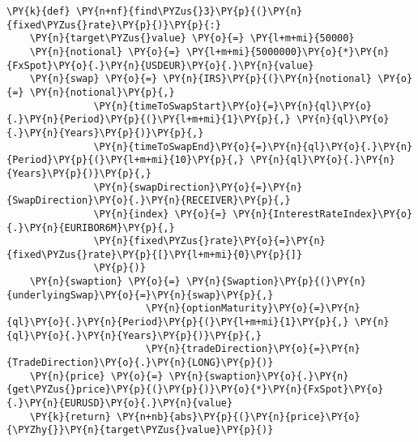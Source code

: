 \begin{tcolorbox}[breakable, size=fbox, boxrule=1pt, pad at break*=1mm,colback=cellbackground, colframe=cellborder]
\begin{Verbatim}[commandchars=\\\{\}]
\PY{k}{def} \PY{n+nf}{find\PYZus{}3}\PY{p}{(}\PY{n}{fixed\PYZus{}rate}\PY{p}{)}\PY{p}{:}
    \PY{n}{target\PYZus{}value} \PY{o}{=} \PY{l+m+mi}{50000}
    \PY{n}{notional} \PY{o}{=} \PY{l+m+mi}{5000000}\PY{o}{*}\PY{n}{FxSpot}\PY{o}{.}\PY{n}{USDEUR}\PY{o}{.}\PY{n}{value}
    \PY{n}{swap} \PY{o}{=} \PY{n}{IRS}\PY{p}{(}\PY{n}{notional} \PY{o}{=} \PY{n}{notional}\PY{p}{,}
               \PY{n}{timeToSwapStart}\PY{o}{=}\PY{n}{ql}\PY{o}{.}\PY{n}{Period}\PY{p}{(}\PY{l+m+mi}{1}\PY{p}{,} \PY{n}{ql}\PY{o}{.}\PY{n}{Years}\PY{p}{)}\PY{p}{,}
               \PY{n}{timeToSwapEnd}\PY{o}{=}\PY{n}{ql}\PY{o}{.}\PY{n}{Period}\PY{p}{(}\PY{l+m+mi}{10}\PY{p}{,} \PY{n}{ql}\PY{o}{.}\PY{n}{Years}\PY{p}{)}\PY{p}{,}
               \PY{n}{swapDirection}\PY{o}{=}\PY{n}{SwapDirection}\PY{o}{.}\PY{n}{RECEIVER}\PY{p}{,}
               \PY{n}{index} \PY{o}{=} \PY{n}{InterestRateIndex}\PY{o}{.}\PY{n}{EURIBOR6M}\PY{p}{,}
               \PY{n}{fixed\PYZus{}rate}\PY{o}{=}\PY{n}{fixed\PYZus{}rate}\PY{p}{[}\PY{l+m+mi}{0}\PY{p}{]}
               \PY{p}{)}
    \PY{n}{swaption} \PY{o}{=} \PY{n}{Swaption}\PY{p}{(}\PY{n}{underlyingSwap}\PY{o}{=}\PY{n}{swap}\PY{p}{,}
                        \PY{n}{optionMaturity}\PY{o}{=}\PY{n}{ql}\PY{o}{.}\PY{n}{Period}\PY{p}{(}\PY{l+m+mi}{1}\PY{p}{,} \PY{n}{ql}\PY{o}{.}\PY{n}{Years}\PY{p}{)}\PY{p}{,}
                        \PY{n}{tradeDirection}\PY{o}{=}\PY{n}{TradeDirection}\PY{o}{.}\PY{n}{LONG}\PY{p}{)}
    \PY{n}{price} \PY{o}{=} \PY{n}{swaption}\PY{o}{.}\PY{n}{get\PYZus{}price}\PY{p}{(}\PY{p}{)}\PY{o}{*}\PY{n}{FxSpot}\PY{o}{.}\PY{n}{EURUSD}\PY{o}{.}\PY{n}{value}
    \PY{k}{return} \PY{n+nb}{abs}\PY{p}{(}\PY{n}{price}\PY{o}{\PYZhy{}}\PY{n}{target\PYZus{}value}\PY{p}{)}


\end{Verbatim}
\end{tcolorbox}
